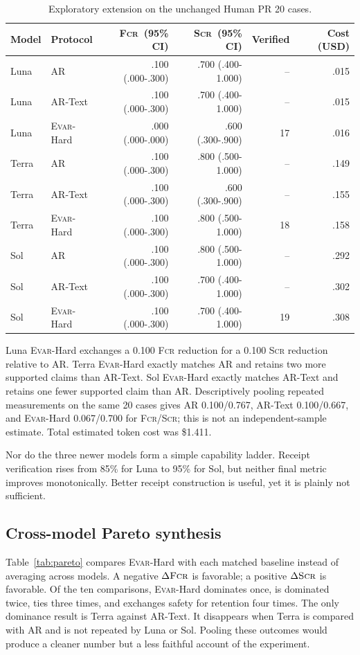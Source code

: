 \documentclass[acmsmall,screen,review,anonymous]{acmart}
\newcommand{\evar}{\textsc{Evar}\xspace}
\newcommand{\fcr}{\textsc{Fcr}\xspace}
\newcommand{\scr}{\textsc{Scr}\xspace}
\begin{document}
\begin{table}[h]
\centering
\caption{Exploratory extension on the unchanged Human PR 20 cases.}
\label{tab:extension}
\scriptsize
\begin{tabular}{@{}llrrrr@{}}
\toprule
Model & Protocol & \fcr\ (95\% CI) & \scr\ (95\% CI) & Verified & Cost (USD) \\
\midrule
Luna & AR & .100 (.000-.300) & .700 (.400-1.000) & -- & .015 \\
Luna & AR-Text & .100 (.000-.300) & .700 (.400-1.000) & -- & .015 \\
Luna & \evar-Hard & .000 (.000-.000) & .600 (.300-.900) & 17 & .016 \\
Terra & AR & .100 (.000-.300) & .800 (.500-1.000) & -- & .149 \\
Terra & AR-Text & .100 (.000-.300) & .600 (.300-.900) & -- & .155 \\
Terra & \evar-Hard & .100 (.000-.300) & .800 (.500-1.000) & 18 & .158 \\
Sol & AR & .100 (.000-.300) & .800 (.500-1.000) & -- & .292 \\
Sol & AR-Text & .100 (.000-.300) & .700 (.400-1.000) & -- & .302 \\
Sol & \evar-Hard & .100 (.000-.300) & .700 (.400-1.000) & 19 & .308 \\
\bottomrule
\end{tabular}
\end{table}

Luna \evar-Hard exchanges a 0.100 \fcr{} reduction for a 0.100 \scr{} reduction relative to AR. Terra \evar-Hard exactly matches AR and retains two more supported claims than AR-Text. Sol \evar-Hard exactly matches AR-Text and retains one fewer supported claim than AR. Descriptively pooling repeated measurements on the same 20 cases gives AR 0.100/0.767, AR-Text 0.100/0.667, and \evar-Hard 0.067/0.700 for \fcr/\scr; this is not an independent-sample estimate. Total estimated token cost was \$1.411.

Nor do the three newer models form a simple capability ladder. Receipt verification rises from 85\% for Luna to 95\% for Sol, but neither final metric improves monotonically. Better receipt construction is useful, yet it is plainly not sufficient.

\subsection{Cross-model Pareto synthesis}

Table~\ref{tab:pareto} compares \evar-Hard with each matched baseline instead of averaging across models. A negative $\Delta\fcr$ is favorable; a positive $\Delta\scr$ is favorable. Of the ten comparisons, \evar-Hard dominates once, is dominated twice, ties three times, and exchanges safety for retention four times. The only dominance result is Terra against AR-Text. It disappears when Terra is compared with AR and is not repeated by Luna or Sol. Pooling these outcomes would produce a cleaner number but a less faithful account of the experiment.
\end{document}
